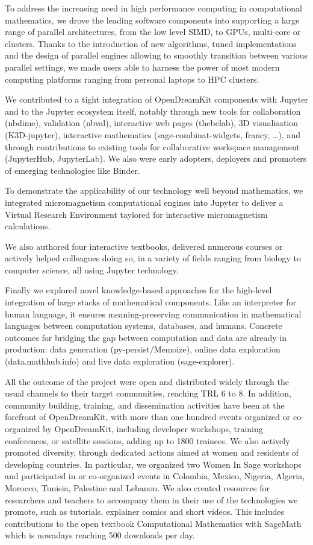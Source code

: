 To address the increasing need in high performance computing in computational mathematics, we drove the 
leading software components into supporting a large range of parallel architectures, from the low level SIMD, 
to GPUs, multi-core or clusters. Thanks to the introduction of new algorithms, tuned implementations and the 
design of parallel engines allowing to smoothly transition between various parallel settings, we made users able 
to harness the power of most modern computing platforms ranging from personal laptops to HPC clusters.

We contributed to a tight integration of OpenDreamKit components with Jupyter and to the Jupyter ecosystem itself, 
notably through new tools for collaboration (nbdime), validation (nbval), interactive web pages (thebelab), 
3D visualisation (K3D-jupyter), interactive mathematics (sage-combinat-widgets, francy, …), and through contributions 
to existing tools for collaborative workspace management (JupyterHub, JupyterLab). We also were early adopters, 
deployers and promoters of emerging technologies like Binder.

To demonstrate the applicability of our technology well beyond mathematics, we integrated micromagnetism computational 
engines into Jupyter to deliver a Virtual Research Environment taylored for interactive micromagnetism calculations.

We also authored four interactive textbooks, delivered numerous courses or actively helped colleagues doing so, 
in a variety of fields ranging from biology to computer science, all using Jupyter technology.

Finally we explored novel knowledge-based approaches for the high-level integration of large stacks of mathematical 
components. Like an interpreter for human language, it ensures meaning-preserving communication in mathematical 
languages between computation systems, databases, and humans. Concrete outcomes for bridging the gap between 
computation and data are already in production: data generation (py-persist/Memoize), online data exploration 
(data.mathhub.info) and live data exploration (sage-explorer).

All the outcome of the project were open and distributed widely through the usual channels to their target communities, 
reaching TRL 6 to 8. In addition, community building, training, and dissemination activities have been at the forefront 
of OpenDreamKit, with more than one hundred events organized or co-organized by OpenDreamKit, including developer 
workshops, training conferences, or satellite sessions, adding up to 1800 trainees. We also actively promoted diversity, 
through dedicated actions aimed at women and residents of developing countries. In particular, we organized two Women In Sage 
workshops and participated in or co-organized events in Colombia, Mexico, Nigeria, Algeria, Morocco, Tunisia, Palestine 
and Lebanon. We also created resources for researchers and teachers to accompany them in their use of the technologies 
we promote, such as tutorials, explainer comics and short videos. This includes contributions to the open textbook 
Computational Mathematics with SageMath which is nowadays reaching 500 downloads per day.

